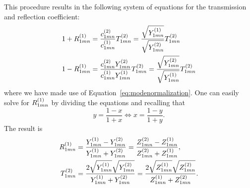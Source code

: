 This procedure results in the following system of equations for the transmission
and reflection coefficient:
\begin{subequations}
  \label{eq:RTsystem1}
  \begin{align}
    1 + R^{(1)}_{1mn} &= \frac{c^{(2)}_{1mn}}{c^{(1)}_{1mn}} T^{(2)}_{1mn} = 
    \frac{\sqrt{Y^{(1)}_{1mn}}}{\sqrt{Y^{(2)}_{1mn}}} T^{(2)}_{1mn} 
    \label{eq:1plusR}\\
    1 - R^{(1)}_{1mn} &= \frac{c^{(2)}_{1mn} Y^{(2)}_{1mn}}{c^{(1)}_{1mn} Y^{(1)}_{1mn}}
    T^{(2)}_{1mn} = 
    \frac{\sqrt{Y^{(2)}_{1mn}}}{\sqrt{Y^{(1)}_{1mn}}} T^{(2)}_{1mn} \label{eq:1minusR}
  \end{align}
\end{subequations}
where we have made use of Equation~\eqref{eq:modenormalization}.
One can easily solve for $R^{(1)}_{1mn}$ by dividing the equations and
recalling that 
\begin{equation}
  y = \frac{1-x}{1+x}  \iff x = \frac{1-y}{1+y}.
\end{equation}
The result is 
\begin{align}
  R^{(1)}_{1mn} &= 
  \frac{Y^{(1)}_{1mn} - Y^{(2)}_{1mn}}{Y^{(1)}_{1mn} + Y^{(2)}_{1mn}} 
  = \frac{Z^{(2)}_{1mn} - Z^{(1)}_{1mn}}{Z^{(2)}_{1mn} + Z^{(1)}_{1mn}}, \\
   T^{(2)}_{1mn} &= 
   \frac{2\sqrt{Y^{(1)}_{1mn}}\sqrt{Y^{(2)}_{1mn}}}{Y^{(1)}_{1mn}+Y^{(2)}_{1mn}}
  = \frac{2\sqrt{Z^{(1)}_{1mn}}\sqrt{Z^{(2)}_{1mn}}}{Z^{(1)}_{1mn}+Z^{(2)}_{1mn}}.
\end{align}


